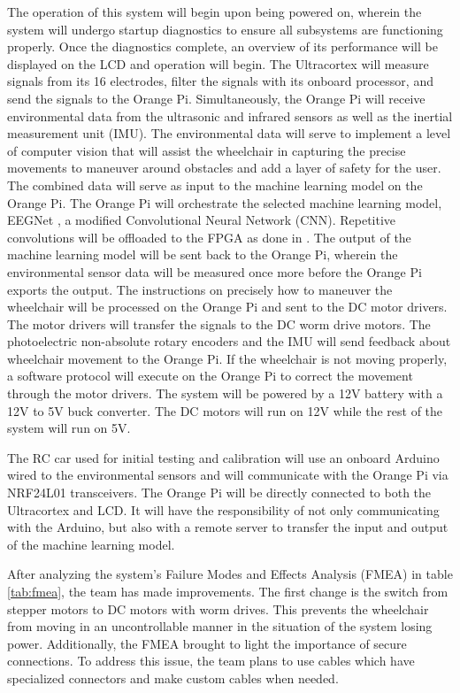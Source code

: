 \documentclass[conference]{IEEEtran}
\begin{document}
    The operation of this system will begin upon being powered on, wherein the system will undergo startup diagnostics to ensure all subsystems are functioning properly. Once the diagnostics complete, an overview of its performance will be displayed on the LCD and operation will begin. The Ultracortex will measure signals from its 16 electrodes, filter the signals with its onboard processor, and send the signals to the Orange Pi. Simultaneously, the Orange Pi will receive environmental data from the ultrasonic and infrared sensors as well as the inertial measurement unit (IMU). The environmental data will serve to implement a level of computer vision that will assist the wheelchair in capturing the precise movements to maneuver around obstacles and add a layer of safety for the user. The combined data will serve as input to the machine learning model on the Orange Pi. The Orange Pi will orchestrate the selected machine learning model, EEGNet \cite{eegnet}, a modified Convolutional Neural Network (CNN). Repetitive convolutions will be offloaded to the FPGA as done in \cite{eegnet_processor_design}. The output of the machine learning model will be sent back to the Orange Pi, wherein the environmental sensor data will be measured once more before the Orange Pi exports the output. The instructions on precisely how to maneuver the wheelchair will be processed on the Orange Pi and sent to the DC motor drivers. The motor drivers will transfer the signals to the DC worm drive motors. The photoelectric non-absolute rotary encoders and the IMU will send feedback about wheelchair movement to the Orange Pi. If the wheelchair is not moving properly, a software protocol will execute on the Orange Pi to correct the movement through the motor drivers. The system will be powered by a 12V battery with a 12V to 5V buck converter. The DC motors will run on 12V while the rest of the system will run on 5V.   

    The RC car used for initial testing and calibration will use an onboard Arduino wired to the environmental sensors and will communicate with the Orange Pi via NRF24L01 transceivers. The Orange Pi will be directly connected to both the Ultracortex and LCD. It will have the responsibility of not only communicating with the Arduino, but also with a remote server to transfer the input and output of the machine learning model.

    After analyzing the system's Failure Modes and Effects Analysis (FMEA) in table \ref{tab:fmea}, the team has made improvements. The first change is the switch from stepper motors to DC motors with worm drives. This prevents the wheelchair from moving in an uncontrollable manner in the situation of the system losing power. Additionally, the FMEA brought to light the importance of secure connections. To address this issue, the team plans to use cables which have specialized connectors and make custom cables when needed.
\end{document}
